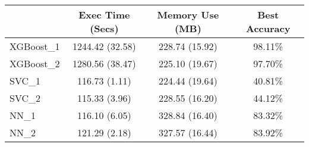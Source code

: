 
\begin{tabular}{|l|c|c|c|} 
\hline
 & \textbf{Exec Time (Secs)} & \textbf{Memory Use (MB)} & \textbf{Best Accuracy}\\
\hline
\hline
XGBoost\_1 & 1244.42 (32.58) & 228.74 (15.92) & 98.11\% \\
\hline
XGBoost\_2 & 1280.56 (38.47) & 225.10 (19.67) & 97.70\% \\
\hline
SVC\_1 & 116.73 (1.11) & 224.44 (19.64) & 40.81\% \\
\hline
SVC\_2 & 115.33 (3.96) & 228.55 (16.20) & 44.12\% \\
\hline
NN\_1 & 116.10 (6.05) & 328.84 (16.40) & 83.32\% \\
\hline
NN\_2 & 121.29 (2.18) & 327.57 (16.44) & 83.92\% \\
\hline

\end{tabular}
